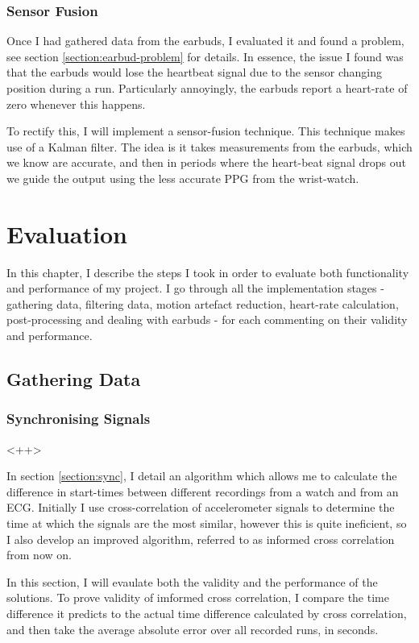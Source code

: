 \documentclass[12pt,a4paper,twoside,openright]{report}
\begin{document}
\subsection{Sensor Fusion}

Once I had gathered data from the earbuds, I evaluated it and found a problem,
see section \ref{section:earbud-problem} for details. In essence, the issue I
found was that the earbuds would lose the heartbeat signal due to the sensor
changing position during a run. Particularly annoyingly, the earbuds report a
heart-rate of zero whenever this happens. 

To rectify this, I will implement a sensor-fusion technique. This technique
makes use of a Kalman filter. The idea is it takes measurements from the earbuds, which
we know are accurate, and then in periods where the heart-beat signal drops
out we guide the output using the less accurate PPG from the wrist-watch.



\chapter{Evaluation}

In this chapter, I describe the steps I took in order to evaluate both
functionality and performance of my project. I go through all the
implementation stages - gathering data, filtering data, motion artefact
reduction, heart-rate calculation, post-processing and dealing with earbuds -
for each commenting on their validity and performance.

\section{Gathering Data}

\subsection{Synchronising Signals} \label{section:evaulate-sync}<++>

In section \ref{section:sync}, I detail an algorithm which allows me to
calculate the difference in start-times between different recordings from a
watch and from an ECG. Initially I use cross-correlation of accelerometer signals to
determine the time at which the signals are the most similar, however this is
quite ineficient, so I also develop an improved algorithm, referred to as
informed cross correlation from now on.

In this section, I will evaulate both the validity and the performance of the
solutions. To prove validity of imformed cross correlation, I compare the
time difference it predicts to the actual time difference calculated by cross
correlation, and then take the average absolute error over all recorded runs,
in seconds. 
\end{document}
